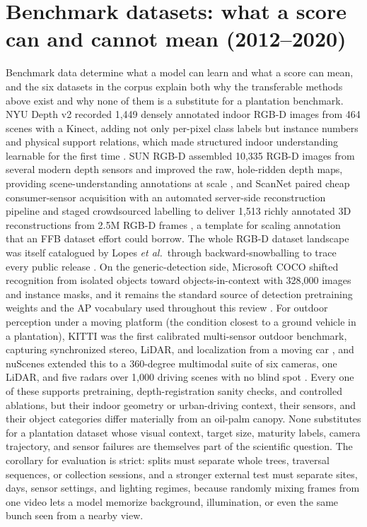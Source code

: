 \section{Benchmark datasets: what a score can and cannot mean (2012--2020)}

Benchmark data determine what a model can learn and what a score can mean, and the six datasets in the corpus explain both why the transferable methods above exist and why none of them is a substitute for a plantation benchmark. NYU Depth v2 recorded 1{,}449 densely annotated indoor RGB-D images from 464 scenes with a Kinect, adding not only per-pixel class labels but instance numbers and physical support relations, which made structured indoor understanding learnable for the first time \cite{silberman2012nyu}. SUN RGB-D assembled 10{,}335 RGB-D images from several modern depth sensors and improved the raw, hole-ridden depth maps, providing scene-understanding annotations at scale \cite{song2015sunrgbd}, and ScanNet paired cheap consumer-sensor acquisition with an automated server-side reconstruction pipeline and staged crowdsourced labelling to deliver 1{,}513 richly annotated 3D reconstructions from 2.5M RGB-D frames \cite{dai2017scannet}, a template for scaling annotation that an FFB dataset effort could borrow. The whole RGB-D dataset landscape was itself catalogued by Lopes \textit{et al.}\ through backward-snowballing to trace every public release \cite{lopes2022rgbddatasets}. On the generic-detection side, Microsoft COCO shifted recognition from isolated objects toward objects-in-context with 328{,}000 images and instance masks, and it remains the standard source of detection pretraining weights and the AP vocabulary used throughout this review \cite{lin2014coco}. For outdoor perception under a moving platform (the condition closest to a ground vehicle in a plantation), KITTI was the first calibrated multi-sensor outdoor benchmark, capturing synchronized stereo, LiDAR, and localization from a moving car \cite{geiger2012kitti}, and nuScenes extended this to a 360-degree multimodal suite of six cameras, one LiDAR, and five radars over 1{,}000 driving scenes with no blind spot \cite{caesar2020nuscenes}. Every one of these supports pretraining, depth-registration sanity checks, and controlled ablations, but their indoor geometry or urban-driving context, their sensors, and their object categories differ materially from an oil-palm canopy. None substitutes for a plantation dataset whose visual context, target size, maturity labels, camera trajectory, and sensor failures are themselves part of the scientific question. The corollary for evaluation is strict: splits must separate whole trees, traversal sequences, or collection sessions, and a stronger external test must separate sites, days, sensor settings, and lighting regimes, because randomly mixing frames from one video lets a model memorize background, illumination, or even the same bunch seen from a nearby view.

